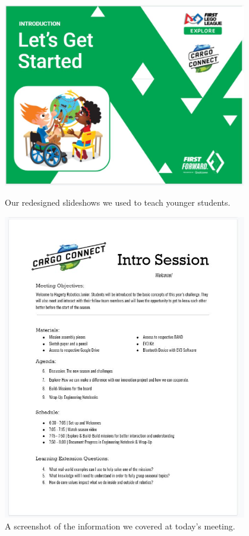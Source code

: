 \begin{figure}[ht]
\centering
\begin{minipage}[b]{.48\textwidth}
  \centering
  \includegraphics[width=0.95\textwidth]{Meetings/September/09-09-21/9-9-21_Outreach_Image1 - Nathan Forrer.JPG}
  \caption{Our redesigned slideshows we used to teach younger students.}
  \label{fig:pic1}
\end{minipage}%
\hfill%
\begin{minipage}[b]{.48\textwidth}
  \centering
  \includegraphics[width=0.95\textwidth]{Meetings/September/09-09-21/9-9-21_Outreach_Image2 - Nathan Forrer.JPG}
  \caption{A screenshot of the information we covered at today's meeting.}
  \label{fig:pic2}
\end{minipage}
\end{figure}

